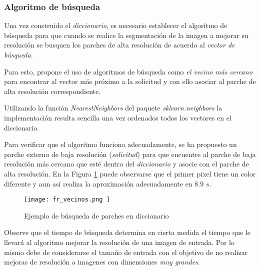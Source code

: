 \subsubsection{Algoritmo de búsqueda}
\noindent
Una vez construido el \emph{diccionario}, es necesario establecer el algoritmo de 
búsqueda para que cuando se realice la segmentación de la imagen a mejorar 
su resolución se busquen los parches de alta resolución de acuerdo al 
\emph{vector de búsqueda}.

Para esto, \cite{freeman} propone el uso de algoritmos de búsqueda como 
\emph{el vecino más cercano} para encontrar al vector más próximo a la solicitud
y con ello asociar al parche de alta resolución correspondiente. 

Utilizando la función \emph{NearestNeighbors} del paquete \emph{sklearn.neighbors}
la implementación resulta sencilla una vez ordenados todos los vectores en el 
diccionario. 

Para verificar que el algoritmo funciona adecuadamente, se ha propuesto un 
parche externo de baja resolución (\emph{solicitud}) para 
que encuentre al parche de baja resolución más cercano que esté dentro del
\emph{diccionario} y asocie con el parche de alta resolución. En la Figura
\ref{fig:fr_vecinos} puede observarse que el primer pixel tiene un color 
diferente y aun así realiza la aproximación adecuadamente en 8.9 $s$. 

\begin{figure}[H]
    \texttt{[image:  fr\_vecinos.png ]}
    \centering
    \caption{ Ejemplo de búsqueda de parches en diccionario}
    \label{fig:fr_vecinos}
\end{figure}

Observe que el tiempo de búsqueda determina en cierta medida el tiempo 
que le llevará al algoritmo mejorar la resolución de una imagen de 
entrada. Por lo mismo debe de considerarse el tamaño de entrada con el 
objetivo de no realizar mejoras de resolución a imagenes con dimensiones
\emph{muy grandes}.